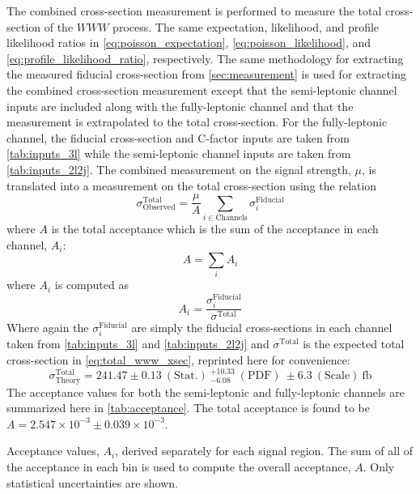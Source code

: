 The combined cross-section measurement is performed to 
measure the total cross-section of the $WWW$ process. 
The same expectation, likelihood, and profile likelihood
ratios in \eqn\eqref{eq:poisson_expectation},
\eqn\eqref{eq:poisson_likelihood}, and
\eqn\eqref{eq:profile_likelihood_ratio}, respectively.
The same methodology for extracting the measured fiducial
cross-section from
\sec\ref{sec:measurement} is used for extracting the combined
cross-section measurement except that the semi-leptonic channel
inputs are included along with the fully-leptonic channel
and that the measurement is extrapolated to the total
cross-section.
For the fully-leptonic channel,
the fiducial cross-section and C-factor inputs 
are taken from \tab\ref{tab:inputs_3l}
while the semi-leptonic channel inputs are taken from 
\tab\ref{tab:inputs_2l2j}.
The combined measurement on the signal strength, $\mu$, is translated
into a measurement on the total cross-section using the relation
\begin{equation}
\sigma^{\textrm{Total}}_{\textrm{Observed}} = \frac{\mu}{A} \sum_{i\in \textrm{Channels}} \sigma^{\textrm{Fiducial}}_i
\label{eq:sigmatot}
\end{equation}
where $A$ is the total acceptance which is the sum of the 
acceptance in each channel, $A_i$:
\begin{equation}
A = \sum_i A_i
\end{equation}
where $A_i$ is computed as
\begin{equation}
A_i = \frac{ \sigma^{\textrm{Fiducial}}_i }{ \sigma^{\textrm{Total}}}
\end{equation}
Where again the $\sigma^{\textrm{Fiducial}}_i $ are simply the fiducial
cross-sections in each channel taken from
\tab\ref{tab:inputs_3l} and \tab\ref{tab:inputs_2l2j}
and $\sigma^{\textrm{Total}}$ is the expected total cross-section
in \eqn\eqref{eq:total_www_xsec}, reprinted here for convenience:
\begin{equation}
\sigma^{\textrm{Total}}_{\textrm{Theory}}= 241.47\pm0.13 ~(\textrm{Stat.}) ~^{+10.33}_{-6.08} ~(\textrm{PDF}) ~\pm 6.3 ~(\textrm{Scale}) ~\textrm{fb} %
\end{equation}
The acceptance values for both the semi-leptonic and fully-leptonic channels 
are summarized here in \tab\ref{tab:acceptance}.
The total acceptance is found to be $A = 2.547 \times 10^{-3} \pm 0.039 \times 10^{-3}$.


\begin{table}[ht!]
\centering

\caption{Acceptance values, $A_i$, derived separately for each signal region. 
The sum of all of the acceptance
in each bin is used to compute the overall acceptance, $A$. 
Only statistical uncertainties are shown.}
\label{tab:acceptance}
\end{table}


